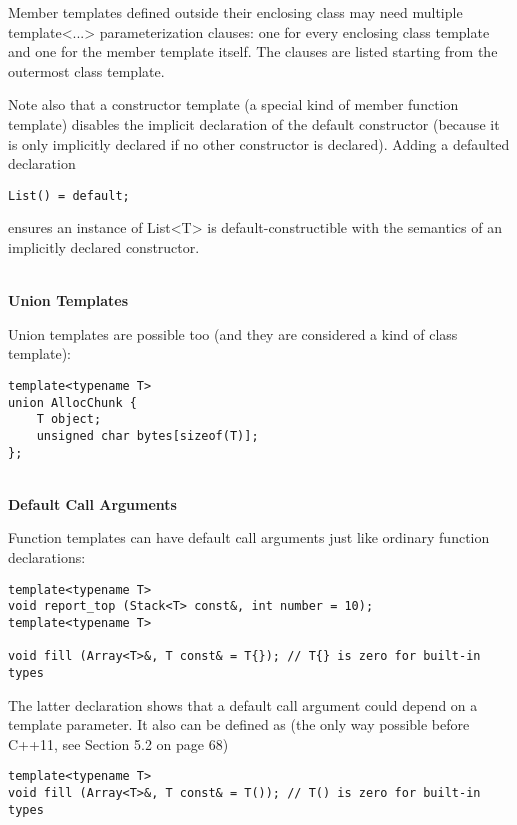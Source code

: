 Member templates defined outside their enclosing class may need multiple template<...> parameterization clauses: one for every enclosing class template and one for the member template itself. The clauses are listed starting from the outermost class template.

Note also that a constructor template (a special kind of member function template) disables the implicit declaration of the default constructor (because it is only implicitly declared if no other constructor is declared). Adding a defaulted declaration

\begin{lstlisting}[style=styleCXX]
List() = default;
\end{lstlisting}

ensures an instance of List<T> is default-constructible with the semantics of an implicitly declared constructor.

\hspace*{\fill} \\ %
\noindent
\textbf{Union Templates}

Union templates are possible too (and they are considered a kind of class template):

\begin{lstlisting}[style=styleCXX]
template<typename T>
union AllocChunk {
	T object;
	unsigned char bytes[sizeof(T)];
};
\end{lstlisting}

\hspace*{\fill} \\ %
\noindent
\textbf{Default Call Arguments}

Function templates can have default call arguments just like ordinary function declarations:

\begin{lstlisting}[style=styleCXX]
template<typename T>
void report_top (Stack<T> const&, int number = 10);
template<typename T>

void fill (Array<T>&, T const& = T{}); // T{} is zero for built-in types
\end{lstlisting}

The latter declaration shows that a default call argument could depend on a template parameter. It also can be defined as (the only way possible before C++11, see Section 5.2 on page 68)

\begin{lstlisting}[style=styleCXX]
template<typename T>
void fill (Array<T>&, T const& = T()); // T() is zero for built-in types
\end{lstlisting}

